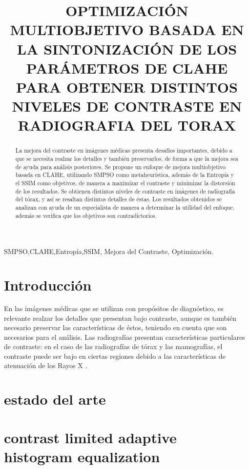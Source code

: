 \documentclass[spanish]{article}
\title{OPTIMIZACIÓN MULTIOBJETIVO BASADA EN LA SINTONIZACIÓN DE LOS PARÁMETROS DE CLAHE PARA OBTENER DISTINTOS NIVELES DE CONTRASTE EN RADIOGRAFIA DEL TORAX}
\begin{document}
%
\maketitle
%
\begin{abstract}
La mejora del contraste en imágenes médicas presenta desafíos importantes, debido a que se necesita realzar los detalles y también preservarlos, de forma a que la mejora sea de ayuda para análisis posteriores. Se propone un enfoque de mejora multiobjetivo basada en CLAHE, utilizando SMPSO como metaheurística, además de la Entropía y el SSIM como objetivos, de manera a maximizar el contraste y minimizar la distorsión de los resultados. Se obtienen distintos niveles de contraste en imágenes de radiografía del tórax, y así se resaltan distintos detalles de éstas. Los resultados obtenidos se analizan con ayuda de un especialista de manera a determinar la utilidad del enfoque, además se verifica que los objetivos son contradictorios.
\end{abstract}
%
\begin{keywords}
SMPSO,CLAHE,Entropía,SSIM, Mejora del Contraste, Optimización.
\end{keywords}
%
\section{Introducción}
\label{sec:intro}

En las imágenes médicas que se utilizan con propósitos de diagnóstico, es relevante realzar los detalles que presentan bajo contraste, aunque es también necesario preservar las características de éstos, teniendo en cuenta que son necesarios para el análisis. Las radiografías presentan características particulares de contraste: en el caso de las radiografías de tórax y las mamografías, el contraste puede ser bajo en ciertas regiones debido a las características de atenuación de los Rayos X \cite{chang1998image}.


\section{estado del arte}

\section{contrast limited adaptive histogram equalization}
\label{sec:clahe}
\end{document}
